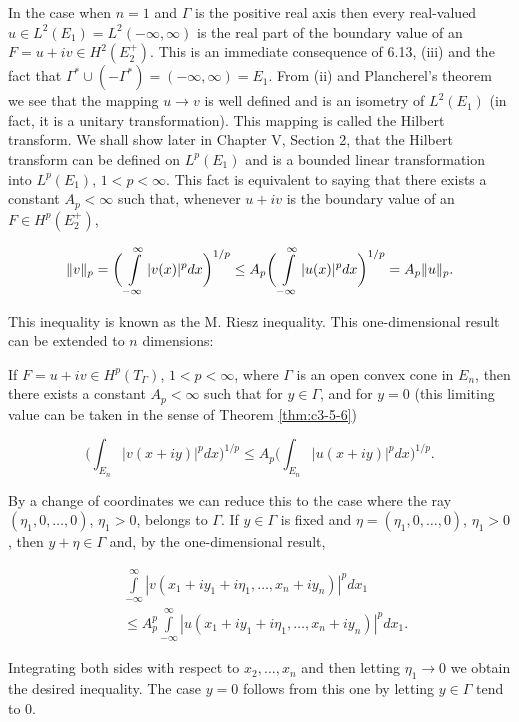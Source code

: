  In the case when $n=1$ and $\Gamma$ is the positive real axis then every real-valued $u\in L^{2}(E_{1})=L^{2}(-\infty,\infty)$ is the real part of the boundary value of an $F=u+iv\in H^{2}(E_{2}^{+})$. This is an immediate consequence of 6.13, (iii) and the fact that $\Gamma^{*}\cup(-\Gamma^{*})=(-\infty,\infty)=E_{1}$. From (ii) and Plancherel's theorem we see that the mapping $u\to v$ is well defined and is an isometry of $L^{2}(E_{1})$ (in fact, it is a unitary transformation). This mapping is called the Hilbert transform. We shall show later in Chapter V, Section 2, that the Hilbert transform can be defined on $L^{p}(E_{1})$ and is a bounded linear transformation into $L^{p}(E_{1})$, $1<p<\infty$. This fact is equivalent to saying that there exists a constant $A_{p}<\infty$ such that, whenever $u+iv$ is the boundary value of an $F\in H^{p}(E_{2}^{+})$,

\[
\|v\|_{p}=\bigg(\intop_{-\infty}^{\infty}|v(x)|^{p}d x\bigg)^{1/p}\leq A_{p}\bigg(\intop_{-\infty}^{\infty}|u(x)|^{p}d x\bigg)^{1/p}=A_{p}\|u\|_{p}.
\]

This inequality is known as the M. Riesz inequality. This one-dimensional result can be extended to $n$ dimensions:

If $F = u + iv \in H^p(T_\Gamma)$, $1 < p < \infty$, where $\Gamma$ is an open convex cone in $E_n$, then there exists a constant $A_p < \infty$ such that for $y \in \Gamma$, and for $y = 0$ (this limiting value can be taken in the sense of Theorem \ref{thm:c3-5-6})

\[
\biggl(\int_{E_{n}}|v(x+i y)|^{p}d x\biggr)^{1/p}\leq A_{p}\biggl(\int_{E_{n}}|u(x+i y)|^{p}d x\biggr)^{1/p}.
\]

By a change of coordinates we can reduce this to the case where the ray $(\eta_1, 0, \ldots, 0)$, $\eta_1 > 0$, belongs to $\Gamma$. If $y \in \Gamma$ is fixed and $\eta = (\eta_1, 0, \ldots, 0)$, $\eta_1 > 0$, then $y + \eta \in \Gamma$ and, by the one-dimensional result,

\[
\begin{aligned}&\int\limits_{-\infty}^{\infty}|v(x_{1}+iy_{1}+i\eta_{1},\ldots,x_{n}+iy_{n})|^{p} dx_{1}\\&\leq A_{p}^{p}\int\limits_{-\infty}^{\infty}|u(x_{1}+iy_{1}+i\eta_{1},\ldots,x_{n}+iy_{n})|^{p} dx_{1}.\end{aligned}
\]

Integrating both sides with respect to $x_2, \ldots, x_n$ and then letting $\eta_1 \to 0$ we obtain the desired inequality. The case $y = 0$ follows from this one by letting $y \in \Gamma$ tend to 0.

